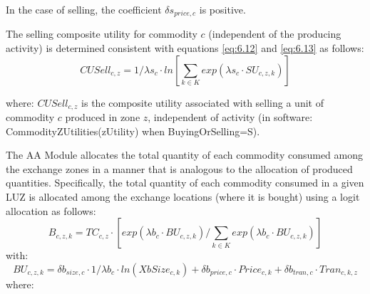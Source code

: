 In the case of selling, the coefficient $\delta s_{price,c}$ is positive.

The selling composite utility for commodity $c$ (independent of the producing activity) is determined consistent with equations \ref{eq:6.12} and \ref{eq:6.13} as follows:
\begin{equation}\label{eq:6.14}
CUSell_{c,z} = 1/\lambda s_c \cdot ln \left[ \sum_{k \in K} exp(\lambda s_c \cdot SU_{c,z,k}) \right]
\end{equation}

\noindent where: $CUSell_{c,z}$ is the composite utility associated with selling a unit of commodity $c$ produced in zone $z$, independent of activity (in software: CommodityZUtilities(zUtility) when BuyingOrSelling=S).

The AA Module allocates the total quantity of each commodity consumed among the exchange zones in a manner that is analogous to the allocation of produced quantities. Specifically, the total quantity of each commodity consumed in a given LUZ is allocated among the exchange locations (where it is bought) using a logit allocation as follows:
\begin{equation}\label{eq:6.16}
B_{c,z,k} = TC_{c,z} \cdot \left[ exp(\lambda b_c \cdot BU_{c,z,k}) / \sum_{k \in K} exp(\lambda b_c \cdot BU_{c,z,k}) \right]
\end{equation}
\noindent with:
\begin{equation}\label{eq:6.17}
BU_{c,z,k} = \delta b_{size,c} \cdot 1/\lambda b_c \cdot ln(XbSize_{c,k}) + \delta b_{price,c} \cdot Price_{c,k} + \delta b_{tran,c} \cdot Tran_{c,k,z}
\end{equation}
\noindent where:
